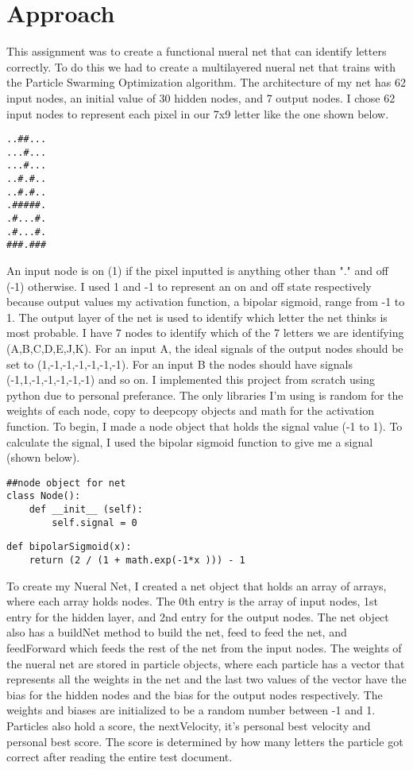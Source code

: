 \documentclass[letterpaper]{article}
\begin{document}
\section{Approach}
This assignment was to create a functional nueral net that can identify letters correctly. To do this we had to create a multilayered nueral net that trains with the Particle Swarming Optimization algorithm. The architecture of my net has 62 input nodes, an initial value of 30 hidden nodes, and 7 output nodes. I chose 62 input nodes to represent each pixel in our 7x9 letter like the one shown below.
\begin{lstlisting}
..##...
...#...
...#...
..#.#..
..#.#..
.#####.
.#...#.
.#...#.
###.###
\end{lstlisting}
An input node is on (1) if the pixel inputted is anything other than "." and off (-1) otherwise. I used 1 and -1 to represent an on and off state respectively because output values my activation function, a bipolar sigmoid, range from -1 to 1. The output layer of the net is used to identify which letter the net thinks is most probable. I have 7 nodes to identify which of the 7 letters we are identifying (A,B,C,D,E,J,K). For an input A, the ideal signals of the output nodes should be set to (1,-1,-1,-1,-1,-1,-1). For an input B the nodes should have signals (-1,1,-1,-1,-1,-1,-1) and so on. I implemented this project from scratch using python due to personal preferance. The only libraries I'm using is random for the weights of each node, copy to deepcopy objects and math for the activation function. To begin, I made a node object that holds the signal value (-1 to 1). To calculate the signal, I used the bipolar sigmoid function to give me a signal (shown below).
\begin{lstlisting}
##node object for net
class Node():
    def __init__ (self):
        self.signal = 0
\end{lstlisting}
\begin{lstlisting}
def bipolarSigmoid(x):
    return (2 / (1 + math.exp(-1*x ))) - 1
\end{lstlisting}
To create my Nueral Net, I created a net object that holds an array of arrays, where each array holds nodes. The 0th entry is the array of input nodes, 1st entry for the hidden layer, and 2nd entry for the output nodes. The net object also has a buildNet method to build the net, feed to feed the net, and feedForward which feeds the rest of the net from the input nodes. The weights of the nueral net are stored in particle objects, where each particle has a vector that represents all the weights in the net and the last two values of the vector have the bias for the hidden nodes and the bias for the output nodes respectively. The weights and biases are initialized to be a random number between -1 and 1. Particles also hold a score, the nextVelocity, it's personal best velocity and personal best score. The score is determined by how many letters the particle got correct after reading the entire test document.
\end{document}
